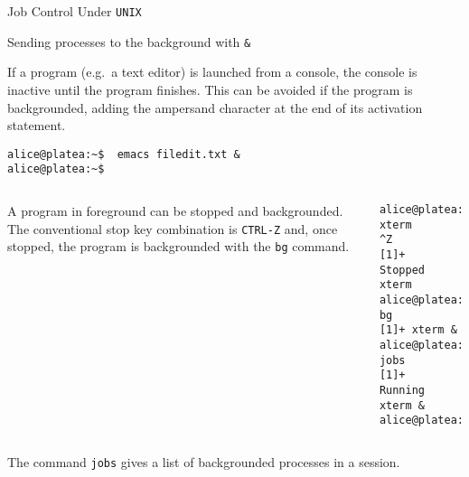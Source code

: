 \begin{frame}[t,fragile]{Job Control Under \texttt{UNIX}}


  \begin{block}{Sending processes to the background with  \alert{\texttt{\&}}}
    {\footnotesize
    If a program (e.g.\ a text editor) is launched from a console, the
console is inactive until the program finishes. This can be avoided if
the program is backgrounded, adding the ampersand character at the end
of its activation statement.


      \begin{lstlisting}
alice@platea:~$  emacs filedit.txt &
alice@platea:~$ 
      \end{lstlisting}
 
}
{\scriptsize

  \begin{columns}
      A program in foreground can be
      stopped and backgrounded. The conventional stop key combination
      is \alert{\texttt{CTRL-Z}}
      and, once stopped, the program is
      backgrounded with the \alert{\texttt{bg}} command.
        \hspace{-3cm}
        \begin{lstlisting}
alice@platea:~$ xterm
^Z
[1]+  Stopped                 xterm
alice@platea:~$ bg
[1]+ xterm &
alice@platea:~$  jobs
[1]+  Running                 xterm &
alice@platea:~$
        \end{lstlisting}
    \end{columns}
  }
      {\footnotesize
 The command
      \alert{\texttt{jobs}} gives a list of backgrounded processes in a session.}
  \end{block}
  
\end{frame}
